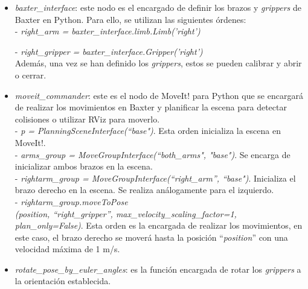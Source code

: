 \begin{itemize}
	\item \textit{baxter\_interface}: este nodo es el encargado de definir los brazos y \textit{grippers} de Baxter en Python. Para ello, se utilizan las siguientes órdenes: \\
	
	- \textit{right\_arm = baxter\_interface.limb.Limb('right')}
	
	- \textit{right\_gripper = baxter\_interface.Gripper('right')}\\
	
	Además, una vez se han definido los \textit{grippers}, estos se pueden calibrar y abrir o cerrar. \\
	
	
	\item \textit{moveit\_commander}: este es el nodo de MoveIt! para Python que se encargará de realizar los movimientos en Baxter y planificar la escena para detectar colisiones o utilizar RViz para moverlo. \\
	
	- \textit{p = PlanningSceneInterface(``base")}. Esta orden inicializa la escena en MoveIt!.\\
	- \textit{arms\_group = MoveGroupInterface(``both\_arms", "base")}. Se encarga de inicializar ambos brazos en la escena. \\
	- \textit{rightarm\_group = MoveGroupInterface(``right\_arm'', ``base")}. Inicializa el brazo derecho en la escena. Se realiza análogamente para el izquierdo.\\
	- \textit{rightarm\_group.moveToPose \\(position, ``right\_gripper'', max\_velocity\_scaling\_factor=1, plan\_only=False)}. Esta orden es la encargada de realizar los movimientos, en este caso, el brazo derecho se moverá hasta la posición ``\textit{position}'' con una velocidad máxima de 1 m/s. \\
	
	\item \textit{rotate\_pose\_by\_euler\_angles}: es la función encargada de rotar los \textit{grippers} a la orientación establecida.\\
\end{itemize}